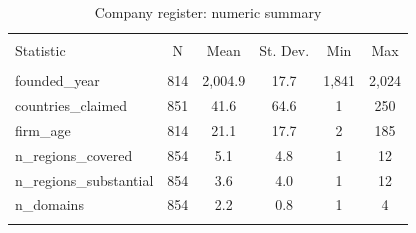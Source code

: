 
\begin{table}[!htbp] \centering 
  \caption{Company register: numeric summary} 
  \label{tab:summary} 
\begin{tabular}{@{\extracolsep{5pt}}lccccc} 
\\[-1.8ex]\hline 
\hline \\[-1.8ex] 
Statistic & \multicolumn{1}{c}{N} & \multicolumn{1}{c}{Mean} & \multicolumn{1}{c}{St. Dev.} & \multicolumn{1}{c}{Min} & \multicolumn{1}{c}{Max} \\ 
\hline \\[-1.8ex] 
founded\_year & 814 & 2,004.9 & 17.7 & 1,841 & 2,024 \\ 
countries\_claimed & 851 & 41.6 & 64.6 & 1 & 250 \\ 
firm\_age & 814 & 21.1 & 17.7 & 2 & 185 \\ 
n\_regions\_covered & 854 & 5.1 & 4.8 & 1 & 12 \\ 
n\_regions\_substantial & 854 & 3.6 & 4.0 & 1 & 12 \\ 
n\_domains & 854 & 2.2 & 0.8 & 1 & 4 \\ 
\hline \\[-1.8ex] 
\end{tabular} 
\end{table} 
